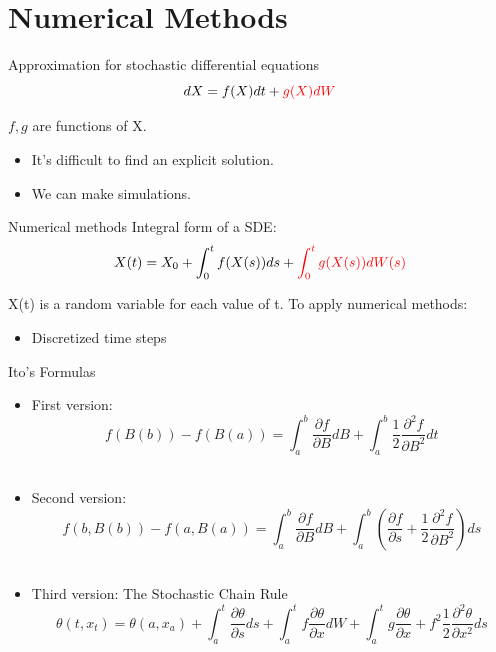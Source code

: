 
\section{Numerical Methods}

\begin{frame}{Approximation for stochastic differential equations}
	\begin{equation*}
	dX=f(X)dt+{\color{red}g(X)dW}
	\end{equation*}
	\begin{center}
	$f,g$ are functions of X.	
	\end{center}
	\begin{itemize}
		\item It's difficult to find an explicit solution.
		\item We can make simulations.
	\end{itemize}
\end{frame}

\begin{frame}{Numerical methods}
Integral form of a SDE: 
$$X(t)=X_0+\int_{0}^{t}f(X(s))ds+{\color{red}\int_{0}^{t}g(X(s))dW(s)}$$

X(t) is a random variable for each value of t. To apply numerical methods:
	\begin{itemize}
		\item Discretized time steps	
	\end{itemize}
\end{frame}

\begin{frame}{Ito's Formulas}
  	\begin{itemize}
   		\item First version: $$f(B(b))-f(B(a))=\int_{a}^{b}{\frac{\partial f}{\partial B} 				dB}+\int_{a}^{b}{\frac{1}{2} \frac{\partial^2 f}{\partial B^2} dt} $$\\
    		\item Second version: $$f(b,B(b))-f(a,B(a))=\int_{a}^{b}{\frac{\partial f}{\partial B} 			dB}+\int_{a}^{b}{\left(\frac{\partial f}{\partial s}+\frac{1}{2}\frac{\partial^2 f}
    		{\partial B^2}\right) ds}$$\\
    		\item Third version: The Stochastic Chain Rule
    		$$\theta (t,x_t)=\theta(a,x_a)+\int_{a}^{t}\frac{\partial \theta}{\partial s}ds+
    		\int_{a}^{t}f\frac{\partial \theta}{\partial x}dW+
  		\int_{a}^{t}g\frac{\partial \theta}{\partial x}+f^2 \frac{1}{2} \frac{\partial ^2\theta}
  		{\partial x^2}ds$$\\
  	\end{itemize}
\end{frame}

